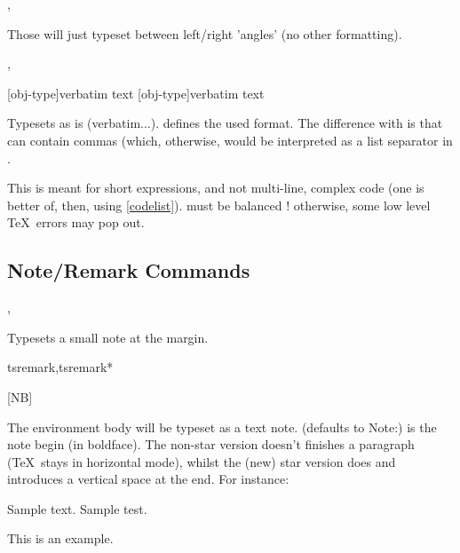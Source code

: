 \documentclass{article}
\begin{document}
\begin{codedescribe}[code]{\typesetmeta,\tsmeta}
\begin{codesyntax}
\end{codesyntax}
 Those will just typeset  between left/right 'angles' (no other formatting).
\end{codedescribe}

\begin{codedescribe}[code]{\typesetverb,\tsverb}
\begin{codesyntax}
\tsmacro{\typesetverb}[obj-type]{verbatim text}
\tsmacro{\tsverb}[obj-type]{verbatim text}
\end{codesyntax}
 Typesets  as is (verbatim...).  defines the used format. The difference with  is that  can contain commas (which, otherwise, would be interpreted as a list separator in \tsobj{\tsobj}.
\end{codedescribe}
\begin{tsremark}
This is meant for short expressions, and not multi-line, complex code (one is better of, then, using \ref{codelist}).   must be balanced ! otherwise, some low level \TeX\ errors may pop out.
\end{tsremark}

\subsection{Note/Remark Commands}\label{note-commands}


\begin{codedescribe}[code]{\typesetmarginnote,\tsmarginnote}
\begin{codesyntax}
\end{codesyntax}
Typesets a small note at the margin.
\end{codedescribe}

\begin{codedescribe}[env,update=2025-04-21]{tsremark,tsremark*}
\begin{codesyntax}
\tsmacro{\begin{tsremark}}[NB]{}
\tsmacro{\end{tsremark}}{}
\end{codesyntax}
 The environment body will be typeset as a text note.  (defaults to Note:) is the note begin (in boldface). The non-star version doesn't finishes a paragraph (\TeX\ stays in horizontal mode), whilst the (new) star version does and introduces a vertical space at the end. For instance:
 \begin{codestore}
 Sample text. Sample test.
  \begin{tsremark}[N.B.]
    This is an example.
  \end{tsremark}
 \end{codestore}
\end{codedescribe}
\end{document}
